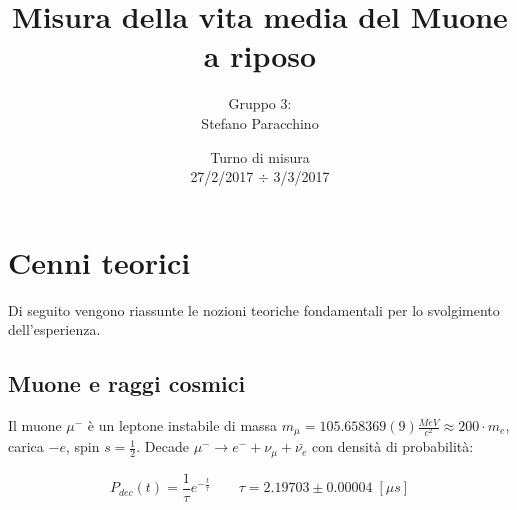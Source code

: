 \documentclass[12pt,a4paper,openright,twoside]{article}
\title{\textbf{Misura della vita media del Muone a riposo}}
\date{\small{ Turno di misura\\
	27/2/2017 $\div $ 3/3/2017 }}
\author{Gruppo 3: \\  
		Stefano Paracchino 
		}
\numberwithin{equation}{section} %
\begin{document}
\maketitle
    

\tableofcontents                        %

\pagebreak

\section{Cenni teorici}
Di seguito vengono riassunte le nozioni teoriche fondamentali per lo svolgimento dell'esperienza.
\subsection{Muone e raggi cosmici} \label{intro}

Il muone $\mu^-$ è un leptone instabile di massa $m_{\mu}=105.658369(9) \frac{MeV}{c^2} \approx 200 \cdot m_e$, carica $-e$, spin $s=\frac{1}{2}$. Decade $\mu^- \rightarrow e^- + \nu_{\mu} + \bar{\nu_{e}}$ con densità di probabilità:

\begin{equation} \label{mainformula}
P_{dec}(t)=\frac{1}{\tau}e^{-\frac{t}{\tau}} \qquad \boxed{\tau=2.19703 \pm 0.00004 \; [\mu s]}
\end{equation}
\end{document}
